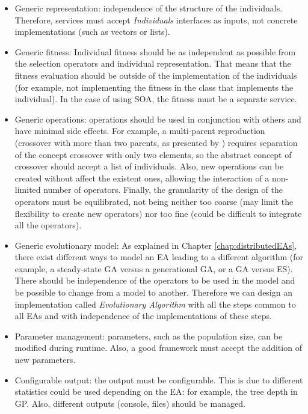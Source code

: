 \begin{itemize}
\item Generic representation: independence of the structure of the individuals. Therefore, services must accept {\em Individuals} interfaces as inputs, not concrete implementations (such as vectors or lists).

\item Generic fitness: Individual fitness should be as independent as possible from the selection operators and individual representation. That means that the fitness evaluation should be outside of the implementation of the individuals (for example, not implementing the fitness in the class that implements the individual). In the case of using SOA, the fitness must be a separate service.

\item Generic operations: operations should be used in conjunction with others and have minimal side effects. For example, a multi-parent reproduction (crossover with more than two parents, as presented by  \cite{EibenMultiparent97}) requires separation of the concept crossover with only two elements, so the abstract concept of crossover  should accept a list of individuals. Also, new operations can be created without affect the existent ones, allowing the interaction of a non-limited number of operators. Finally, the granularity of the design of the operators must be equilibrated, not being neither too coarse (may limit the flexibility to create new operators) nor too fine (could be difficult to integrate all the operators).

\item Generic evolutionary model: As explained in Chapter \ref{chap:distributedEAs}, there exist different ways to model an EA leading to a different algorithm (for example, a steady-state GA versus a generational GA, or a GA versus ES). There should be independence of the operators to be used in the model and be possible to change from a model to another. Therefore we can design an implementation called {\em Evolutionary Algorithm} with all the steps common to all EAs and with independence of the implementations of these steps.


\item Parameter management: parameters, such as the population size, can be modified during runtime. Also, a good framework must accept the addition of new parameters.

\item Configurable output: the output must be configurable. This is due to different statistics could be used depending on the EA: for example, the tree depth in GP. Also, different outputs (console, files) should be managed.



\end{itemize}

